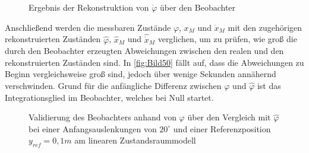 \begin{figure}[H]
    \centering
    \caption[Rekonstruktion $\dot{\varphi}$]{Ergebnis der Rekonstruktion von $\dot{\varphi}$ über den Beobachter}
    \label{fig:Bild49}
\end{figure}

Anschließend werden die messbaren Zustände $\varphi$, $x_M$ und $\dot{x}_M$ mit den zugehörigen rekonstruierten Zuständen $\hat{\varphi}$, $\hat{x}_M$ und $\hat{\dot{x}}_M$ verglichen, um zu prüfen, wie groß die durch den Beobachter erzeugten Abweichungen zwischen den realen und den rekonstruierten Zuständen sind. In \autoref{fig:Bild50} fällt auf, dass die Abweichungen zu Beginn vergleichsweise groß sind, jedoch über wenige Sekunden annähernd verschwinden. Grund für die anfängliche Differenz zwischen $\varphi$ und $\hat{\varphi}$ ist das Integrationsglied im Beobachter, welches bei Null startet. 

\begin{figure}[H]
    \centering
    \caption[Vergleich $\varphi$, $\hat{\varphi}$]{Validierung des Beobachters anhand von $\varphi$ über den Vergleich mit $\hat{\varphi}$ bei einer Anfangsauslenkungen von $20^\circ$ und einer Referenzposition $y_{ref} = 0,1 m$ am linearen Zustandsraummodell}
    \label{fig:Bild50}
\end{figure}

